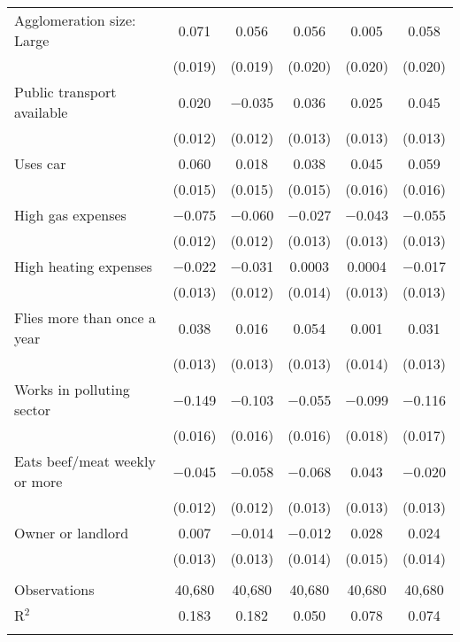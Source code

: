 \begin{tabular}{@{\extracolsep{5pt}}lccccc}
  Agglomeration size: Large & 0.071 & 0.056 & 0.056 & 0.005 & 0.058 \\ 
  & (0.019) & (0.019) & (0.020) & (0.020) & (0.020) \\ 
  Public transport available & 0.020 & $-$0.035 & 0.036 & 0.025 & 0.045 \\ 
  & (0.012) & (0.012) & (0.013) & (0.013) & (0.013) \\ 
  Uses car & 0.060 & 0.018 & 0.038 & 0.045 & 0.059 \\ 
  & (0.015) & (0.015) & (0.015) & (0.016) & (0.016) \\ 
  High gas expenses & $-$0.075 & $-$0.060 & $-$0.027 & $-$0.043 & $-$0.055 \\ 
  & (0.012) & (0.012) & (0.013) & (0.013) & (0.013) \\ 
  High heating expenses & $-$0.022 & $-$0.031 & 0.0003 & 0.0004 & $-$0.017 \\ 
  & (0.013) & (0.012) & (0.014) & (0.013) & (0.013) \\ 
  Flies more than once a year & 0.038 & 0.016 & 0.054 & 0.001 & 0.031 \\ 
  & (0.013) & (0.013) & (0.013) & (0.014) & (0.013) \\ 
  Works in polluting sector & $-$0.149 & $-$0.103 & $-$0.055 & $-$0.099 & $-$0.116 \\ 
  & (0.016) & (0.016) & (0.016) & (0.018) & (0.017) \\ 
  Eats beef/meat weekly or more & $-$0.045 & $-$0.058 & $-$0.068 & 0.043 & $-$0.020 \\ 
  & (0.012) & (0.012) & (0.013) & (0.013) & (0.013) \\ 
  Owner or landlord & 0.007 & $-$0.014 & $-$0.012 & 0.028 & 0.024 \\ 
  & (0.013) & (0.013) & (0.014) & (0.015) & (0.014) \\ 
 \hline \\[-1.8ex] 

Observations & 40,680 & 40,680 & 40,680 & 40,680 & 40,680 \\ 
R$^{2}$ & 0.183 & 0.182 & 0.050 & 0.078 & 0.074 \\ 
\hline 
\hline \\[-1.8ex] 
\end{tabular} 